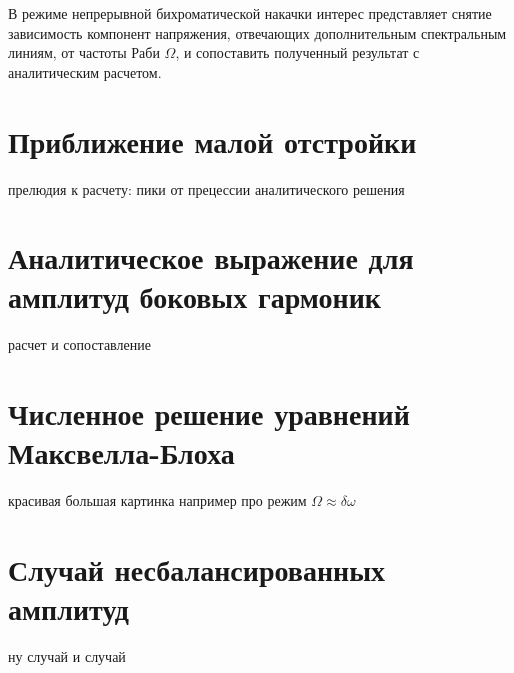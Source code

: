 В режиме непрерывной бихроматической накачки интерес представляет снятие зависимость компонент напряжения, отвечающих дополнительным спектральным линиям, от частоты Раби $\Omega$, и сопоставить полученный результат с аналитическим расчетом. 



\section{Приближение малой отстройки}
прелюдия к расчету: пики от прецессии аналитического решения
\section{Аналитическое выражение для амплитуд боковых гармоник}
расчет и сопоставление
\section{Численное решение уравнений Максвелла-Блоха}
красивая большая картинка например про режим $\Omega \approx \delta \omega$
\section{Случай несбалансированных амплитуд}
 ну случай и случай